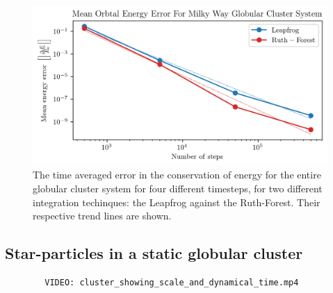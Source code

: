         \begin{figure}
            \centering
            \includegraphics[width=\linewidth]{images/numericalErrorMeanEnergyErrorRuthForestLeapfrog.png}
            \caption{The time averaged error in the conservation of energy for the entire globular cluster system for four different timesteps, for two different integration techinques: the Leapfrog against the Ruth-Forest. Their respective trend lines are shown.}
            \label{fig:numericalErrorMeanEnergyErrorRuthForestLeapfrog}
        \end{figure}

    \subsection{Star-particles in a static globular cluster}

        \begin{verbatim}
        VIDEO: cluster_showing_scale_and_dynamical_time.mp4
        \end{verbatim}
        
